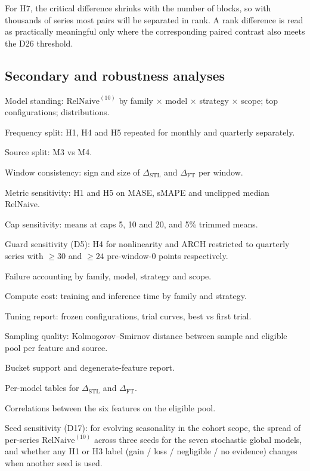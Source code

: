 \documentclass[11pt,a4paper]{article}
\newcommand{\RN}{\mathrm{RelNaive}^{(10)}}
\newcommand{\dstl}{\Delta_{\mathrm{STL}}}
\newcommand{\dft}{\Delta_{\mathrm{FT}}}
\begin{document}
For H7, the critical difference shrinks with the number of blocks, so with thousands of series
most pairs will be separated in rank. A rank difference is read as practically meaningful only
where the corresponding paired contrast also meets the D26 threshold.

\subsection{Secondary and robustness analyses}

\begin{description}[leftmargin=1.1cm,style=sameline,font=\normalfont\bfseries]
  \item[A1] Model standing: $\RN$ by family $\times$ model $\times$ strategy $\times$ scope; top
  configurations; distributions.
  \item[A2] Frequency split: H1, H4 and H5 repeated for monthly and quarterly separately.
  \item[A3] Source split: M3 vs M4.
  \item[A4] Window consistency: sign and size of $\dstl$ and $\dft$ per window.
  \item[A5] Metric sensitivity: H1 and H5 on MASE, sMAPE and unclipped median RelNaive.
  \item[A6] Cap sensitivity: means at caps 5, 10 and 20, and 5\% trimmed means.
  \item[A7] Guard sensitivity (D5): H4 for nonlinearity and ARCH restricted to quarterly series with
  $\geq 30$ and $\geq 24$ pre-window-0 points respectively.
  \item[A8] Failure accounting by family, model, strategy and scope.
  \item[A9] Compute cost: training and inference time by family and strategy.
  \item[A10] Tuning report: frozen configurations, trial curves, best vs first trial.
  \item[A11] Sampling quality: Kolmogorov--Smirnov distance between sample and eligible pool per
  feature and source.
  \item[A12] Bucket support and degenerate-feature report.
  \item[A13] Per-model tables for $\dstl$ and $\dft$.
  \item[A14] Correlations between the six features on the eligible pool.
  \item[A15] Seed sensitivity (D17): for evolving seasonality in the cohort scope, the spread of
  per-series $\RN$ across three seeds for the seven stochastic global models, and whether any H1 or
  H3 label (gain / loss / negligible / no evidence) changes when another seed is used.
\end{description}
\end{document}
